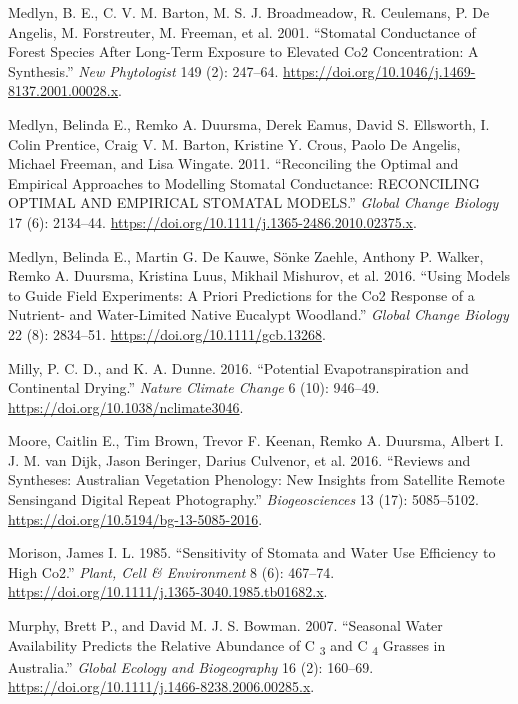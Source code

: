 \documentclass[
]{article}
\newlength{\cslhangindent}
\newlength{\cslentryspacingunit} %
\newenvironment{CSLReferences}[2] %
 {%
  \setlength{\parindent}{0pt}
  \ifodd #1
  \let\oldpar\par
  \def\par{\hangindent=\cslhangindent\oldpar}
  \fi
  \setlength{\parskip}{#2\cslentryspacingunit}
 }%
 {}
\begin{document}
\begin{CSLReferences}{1}{0}
\leavevmode{}%
Medlyn, B. E., C. V. M. Barton, M. S. J. Broadmeadow, R. Ceulemans, P.
De Angelis, M. Forstreuter, M. Freeman, et al. 2001. {``Stomatal
Conductance of Forest Species After Long-Term Exposure to Elevated {Co2}
Concentration: A Synthesis.''} \emph{New Phytologist} 149 (2): 247--64.
\url{https://doi.org/10.1046/j.1469-8137.2001.00028.x}.

\leavevmode{}%
Medlyn, Belinda E., Remko A. Duursma, Derek Eamus, David S. Ellsworth,
I. Colin Prentice, Craig V. M. Barton, Kristine Y. Crous, Paolo De
Angelis, Michael Freeman, and Lisa Wingate. 2011. {``Reconciling the
Optimal and Empirical Approaches to Modelling Stomatal Conductance:
{RECONCILING OPTIMAL AND EMPIRICAL STOMATAL MODELS}.''} \emph{Global
Change Biology} 17 (6): 2134--44.
\url{https://doi.org/10.1111/j.1365-2486.2010.02375.x}.

\leavevmode{}%
Medlyn, Belinda E., Martin G. De Kauwe, Sönke Zaehle, Anthony P. Walker,
Remko A. Duursma, Kristina Luus, Mikhail Mishurov, et al. 2016. {``Using
Models to Guide Field Experiments: A Priori Predictions for the {Co2}
Response of a Nutrient- and Water-Limited Native {Eucalypt} Woodland.''}
\emph{Global Change Biology} 22 (8): 2834--51.
\url{https://doi.org/10.1111/gcb.13268}.

\leavevmode{}%
Milly, P. C. D., and K. A. Dunne. 2016. {``Potential Evapotranspiration
and Continental Drying.''} \emph{Nature Climate Change} 6 (10): 946--49.
\url{https://doi.org/10.1038/nclimate3046}.

\leavevmode{}%
Moore, Caitlin E., Tim Brown, Trevor F. Keenan, Remko A. Duursma, Albert
I. J. M. van Dijk, Jason Beringer, Darius Culvenor, et al. 2016.
{``Reviews and Syntheses: {Australian} Vegetation Phenology: New
Insights from Satellite Remote Sensingand Digital Repeat Photography.''}
\emph{Biogeosciences} 13 (17): 5085--5102.
\url{https://doi.org/10.5194/bg-13-5085-2016}.

\leavevmode{}%
Morison, James I. L. 1985. {``Sensitivity of Stomata and Water Use
Efficiency to High {Co2}.''} \emph{Plant, Cell \& Environment} 8 (6):
467--74. \url{https://doi.org/10.1111/j.1365-3040.1985.tb01682.x}.

\leavevmode{}%
Murphy, Brett P., and David M. J. S. Bowman. 2007. {``Seasonal Water
Availability Predicts the Relative Abundance of {C} {\textsubscript{3}}
and {C} {\textsubscript{4}} Grasses in {Australia}.''} \emph{Global
Ecology and Biogeography} 16 (2): 160--69.
\url{https://doi.org/10.1111/j.1466-8238.2006.00285.x}.


\end{CSLReferences}
\end{document}
